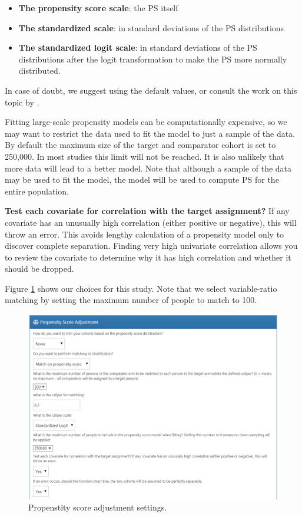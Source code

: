 \documentclass[11pt]{book}
\providecommand{\tightlist}{%
  \setlength{\itemsep}{0pt}\setlength{\parskip}{0pt}}
\begin{document}
\begin{itemize}
\tightlist
\item
  \textbf{The propensity score scale}: the PS itself
\item
  \textbf{The standardized scale}: in standard deviations of the PS
  distributions
\item
  \textbf{The standardized logit scale}: in standard deviations of the
  PS distributions after the logit transformation to make the PS more
  normally distributed.
\end{itemize}

In case of doubt, we suggest using the default values, or consult the
work on this topic by \citet{austin_2011}.

Fitting large-scale propensity models can be computationally expensive,
so we may want to restrict the data used to fit the model to just a
sample of the data. By default the maximum size of the target and
comparator cohort is set to 250,000. In most studies this limit will not
be reached. It is also unlikely that more data will lead to a better
model. Note that although a sample of the data may be used to fit the
model, the model will be used to compute PS for the entire population.

\textbf{Test each covariate for correlation with the target assignment?}
If any covariate has an unusually high correlation (either positive or
negative), this will throw an error. This avoids lengthy calculation of
a propensity model only to discover complete separation. Finding very
high univariate correlation allows you to review the covariate to
determine why it has high correlation and whether it should be dropped.

Figure \ref{fig:psSettings} shows our choices for this study. Note that
we select variable-ratio matching by setting the maximum number of
people to match to 100.

\begin{figure}

{\centering \includegraphics[width=1\linewidth]{images/PopulationLevelEstimation/psSettings} 

}

\caption{Propenstity score adjustment settings.}\label{fig:psSettings}
\end{figure}
\end{document}
